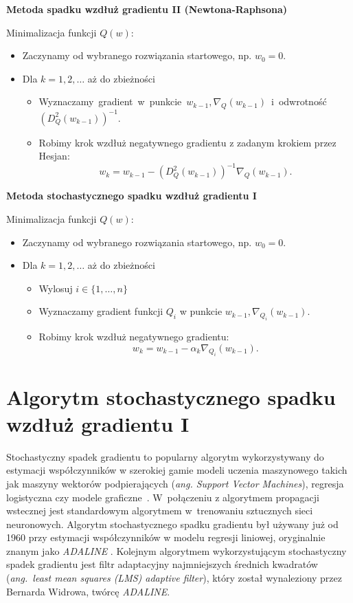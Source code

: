 \begin{center}
\textbf{Metoda spadku wzdłuż gradientu II (Newtona-Raphsona)}
\end{center}
Minimalizacja funkcji $Q(w)$:
\begin{itemize}
\item Zaczynamy od wybranego rozwiązania startowego, np. $w_{0} = 0$.
\item Dla $k = 1, 2, \dots$ aż do zbieżności
	\begin{itemize}
	\item Wyznaczamy~gradient~w~punkcie~$w_{k-1}, \nabla_{Q}(w_{k-1})$~i~odwrotność~$(D_{Q}^{2}(w_{k-1}))^{-1}$.
	\item Robimy krok wzdłuż negatywnego gradientu z zadanym krokiem przez Hesjan: 
	\begin{equation}\label{NJU-rap}
	 w_{k} = w_{k-1} - (D_{Q}^{2}(w_{k-1}))^{-1}\nabla_{Q}(w_{k-1}). 
	 \end{equation}	
	\end{itemize}
\end{itemize}
\begin{center}
\textbf{Metoda stochastycznego spadku wzdłuż gradientu I}
\end{center}
Minimalizacja funkcji $Q(w)$:
\begin{itemize}
\item Zaczynamy od wybranego rozwiązania startowego, np. $w_{0} = 0$.
\item Dla $k = 1, 2, \dots$ aż do zbieżności
	\begin{itemize}
	\item Wylosuj $i \in \{1,\dots,n\}$
	\item Wyznaczamy gradient funkcji $Q_{i}$ w punkcie $w_{k-1}, \nabla_{Q_{i}}(w_{k-1})$.
	\item Robimy krok wzdłuż negatywnego gradientu: 
	\begin{equation}\label{sgdrownanie}
	 w_{k} = w_{k-1} - \alpha_{k}\nabla_{Q_{i}}(w_{k-1}).
	  \end{equation}
	\end{itemize}
\end{itemize}

\section{Algorytm stochastycznego spadku wzdłuż gradientu I}\label{SGD}
Stochastyczny spadek gradientu to popularny algorytm wykorzystywany do estymacji współczynników w szerokiej gamie modeli uczenia maszynowego takich jak maszyny wektorów podpierających (\textit{ang. Support Vector Machines}), regresja logistyczna czy modele graficzne~\cite{finkel}. W~połączeniu z algorytmem propagacji wstecznej jest standardowym algorytmem w~trenowaniu sztucznych sieci neuronowych. Algorytm stochastycznego spadku gradientu był używany już od 1960 przy estymacji współczynników w modelu regresji liniowej, oryginalnie znanym jako \textit{ADALINE} \cite{ADALINE}. Kolejnym algorytmem wykorzystującym stochastyczny spadek gradientu jest filtr adaptacyjny najmniejszych średnich kwadratów \cite{widrow2} (\textit{ang.~least mean squares (LMS) adaptive filter}), który został wynaleziony przez Bernarda Widrowa, twórcę \textit{ADALINE}.

